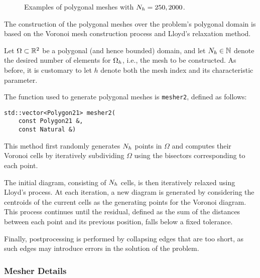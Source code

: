 \begin{figure}[!ht]
    \begin{subfigure}[b]{0.49\textwidth}
		\centering
        
    \end{subfigure}
	\hfill
    \begin{subfigure}[b]{0.49\textwidth}
		\centering
        
    \end{subfigure}
    \caption{Examples of polygonal meshes with $N_h = 250, 2000$.}
\end{figure}

The construction of the polygonal meshes over the problem's polygonal domain is based on the Voronoi mesh construction process and Lloyd's relaxation method.

Let $\Omega \subset \mathbb{R}^{2}$ be a polygonal (and hence bounded) domain, and let $N_h \in \mathbb{N}$ denote the desired number of elements for $\Omega_{h}$, i.e., the mesh to be constructed. As before, it is customary to let $h$ denote both the mesh index and its characteristic parameter.

The function used to generate polygonal meshes is \lstinline{mesher2}, defined as follows:

\begin{lstlisting}[style=cpp]
std::vector<Polygon21> mesher2(
    const Polygon21 &, 
    const Natural &)
\end{lstlisting}

This method first randomly generates $N_h$ points in $\Omega$ and computes their Voronoi cells by iteratively subdividing $\Omega$ using the bisectors corresponding to each point.

The initial diagram, consisting of $N_h$ cells, is then iteratively relaxed using Lloyd's process. At each iteration, a new diagram is generated by considering the centroids of the current cells as the generating points for the Voronoi diagram. This process continues until the residual, defined as the sum of the distances between each point and its previous position, falls below a fixed tolerance.

Finally, postprocessing is performed by collapsing edges that are too short, as such edges may introduce errors in the solution of the problem.

\newpage
\subsubsection{Mesher Details}

